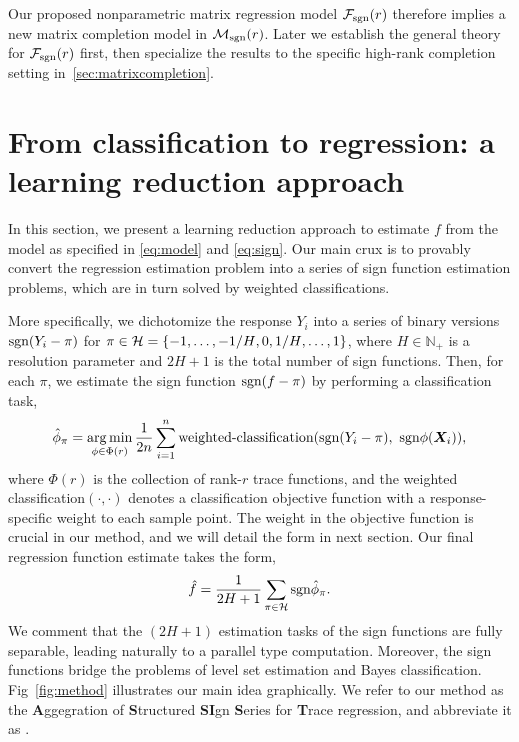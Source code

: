 \documentclass[aos]{imsart}
\theoremstyle{definition}
\def\sign{\textup{sgn}}
\def\NonparaM{\text{\bf \footnotesize ASSIST }}
\def\caliF{\tF_{\textup{sgn}}}
\def\caliM{\tM_{\textup{sgn}}}
\begin{document}
Our proposed nonparametric matrix regression model $\caliF(r)$ therefore implies a new matrix completion model in $\caliM(r)$. Later we establish the general theory for $\caliF(r)$ first, then specialize the results to the specific high-rank completion setting in~\ref{sec:matrixcompletion}. 





\section{From classification to regression: a learning reduction approach}
\label{sec:bridge}

In this section, we present a learning reduction approach to estimate $f$ from the model as specified in \eqref{eq:model} and \eqref{eq:sign}. Our main crux is to provably convert
the regression estimation problem into a series of sign function estimation problems, which are in turn solved by weighted classifications. 

More specifically, we dichotomize the response $Y_i$ into a series of binary versions $\sign(Y_i-\pi)$ for $\pi\in\mathcal{H}=\{-1,\ldots,-{1/H}, 0, {1/H}, \ldots,1\}$, where $H\in\mathbb{N}_{+}$ is a resolution parameter and $2H+1$ is the total number of sign functions. Then, for each $\pi$, we estimate the sign function $\sign(f-\pi)$ by performing a classification task, 
\begin{equation}\label{eq:proposal}
\hat \phi_\pi =\argmin_{\phi\in\Phi(r)}{1\over 2n}\sum_{i=1}^n\text{weighted-classification}(\sign(Y_i-\pi),\ \sign \phi(\mX_i)),
\end{equation}
where $\Phi(r)$ is the collection of rank-$r$ trace functions, and the weighted classification$(\cdot,\cdot)$ denotes a classification objective function with a response-specific weight to each sample point. The weight in the objective function is crucial in our method, and we will detail the form in next section. Our final regression function estimate takes the form, 
\begin{equation}\label{eq:stepfunction}
\hat f= {1\over 2H+1}\sum_{\pi \in \tH} \sign \hat \phi_\pi.
\end{equation}
We comment that the $(2H+1)$ estimation tasks of the sign functions are fully separable, leading naturally to a parallel type computation. Moreover, the sign functions bridge the problems of level set estimation and Bayes classification.  Fig~\ref{fig:method} illustrates our main idea graphically. We refer to our method as the {\bf \small A}ggegration of {\bf \small S}tructured {\bf \small SI}gn {\bf \small S}eries for {\bf \small T}race regression, and abbreviate it as \NonparaM.
\end{document}
